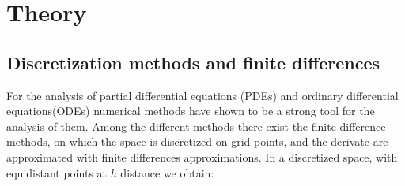 \section{Theory}
\subsection{Discretization methods and finite differences}
For the analysis of partial differential equations (PDEs) and ordinary differential equations(ODEs)
numerical methods have shown to be a strong tool for the analysis of them. Among the different methods
there exist the finite difference methods, on which the space is discretized on grid points,
and the derivate are approximated with finite differences approximations. In a discretized space, with equidistant
points at $h$ distance we obtain:


